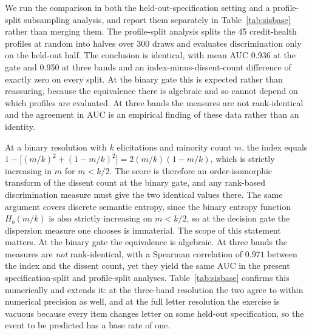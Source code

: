 \documentclass[a4paper,fleqn]{cas-sc}
\begin{document}
We run the comparison in both the held-out-specification setting and a profile-split subsampling analysis, and report them separately in Table~\ref{tab:sisbase} rather than merging
them. The profile-split analysis splits the 45 credit-health profiles at random into
halves over 300 draws and evaluates discrimination only on the held-out half. The conclusion is identical, with mean AUC
0.936 at the gate and 0.950 at three bands and an index-minus-dissent-count difference of exactly
zero on every split. At the binary gate this is expected rather than reassuring, because the equivalence there is
algebraic and so cannot depend on which profiles are evaluated. At three bands the measures are not
rank-identical and the agreement in AUC is an empirical finding of these data rather than an
identity.

At a binary resolution with $k$ elicitations and minority count $m$, the index equals
$1-\big[(m/k)^2+(1-m/k)^2\big]=2(m/k)(1-m/k)$, which is strictly increasing in $m$ for $m<k/2$. The
score is therefore an order-isomorphic transform of the dissent count at the binary gate, and any
rank-based discrimination measure must give the two identical values there. The same argument covers
discrete semantic entropy, since the binary entropy function $H_b(m/k)$ is also strictly increasing
on $m<k/2$, so at the decision gate the dispersion measure one chooses is immaterial. The scope of
this statement matters. At the binary gate the equivalence is algebraic. At three bands the measures
are \emph{not} rank-identical, with a Spearman correlation of $0.971$ between the index and the
dissent count, yet they yield the same AUC in the present specification-split and profile-split
analyses. Table~\ref{tab:sisbase} confirms this
numerically and extends it: at the three-band resolution the two agree to within numerical
precision as well, and at the full letter resolution the exercise is vacuous because every item
changes letter on some held-out specification, so the event to be predicted has a base rate of one.
\end{document}
